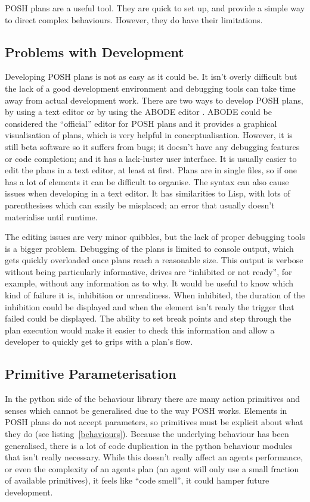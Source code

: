 \documentclass[11pt,openright,a4paper]{report}
\begin{document}
POSH plans are a useful tool. They are quick to set up, and provide a simple way to direct complex behaviours. However, they do have their limitations.

\subsection{Problems with Development}
\label{POSHDev}
Developing POSH plans is not as easy as it could be. It isn't overly difficult but the lack of a good development environment and debugging tools can take time away from actual development work. There are two ways to develop POSH plans, by using a text editor or by using the ABODE editor \cite{abode}. ABODE could be considered the ``official'' editor for POSH plans and it provides a graphical visualisation of plans, which is very helpful in conceptualisation. However, it is still beta software so it suffers from bugs; it doesn't have any debugging features or code completion; and it has a lack-luster user interface. It is usually easier to edit the plans in a text editor, at least at first. Plans are in single files, so if one has a lot of elements it can be difficult to organise.  The syntax can also cause issues when developing in a text editor. It has similarities to Lisp, with lots of parenthesises which can easily be misplaced; an error that usually doesn't materialise until runtime.

The editing issues are very minor quibbles, but the lack of proper debugging tools is a bigger problem. Debugging of the plans is limited to console output, which gets quickly overloaded once plans reach a reasonable size. This output is verbose without being particularly informative, drives are ``inhibited or not ready'', for example, without any information as to why. It would be useful to know which kind of failure it is, inhibition or unreadiness. When inhibited, the duration of the inhibition could be displayed and when the element isn't ready the trigger that failed could be displayed. The ability to set break points and step through the plan execution would make it easier to check this information and allow a developer to quickly get to grips with a plan's flow.

\subsection{Primitive Parameterisation}
\label{POSHPara}
In the python side of the behaviour library there are many action primitives and senses which cannot be generalised due to the way POSH works. Elements in POSH plans do not accept parameters, so primitives must be explicit about what they do (see listing~\ref{behaviours}). Because the underlying behaviour has been generalised, there is a lot of code duplication in the python behaviour modules that isn't really necessary. While this doesn't really affect an agents performance, or even the complexity of an agents plan (an agent will only use a small fraction of available primitives), it feels like ``code smell''\cite{Emden02javaquality}, it could hamper future development.
\end{document}
